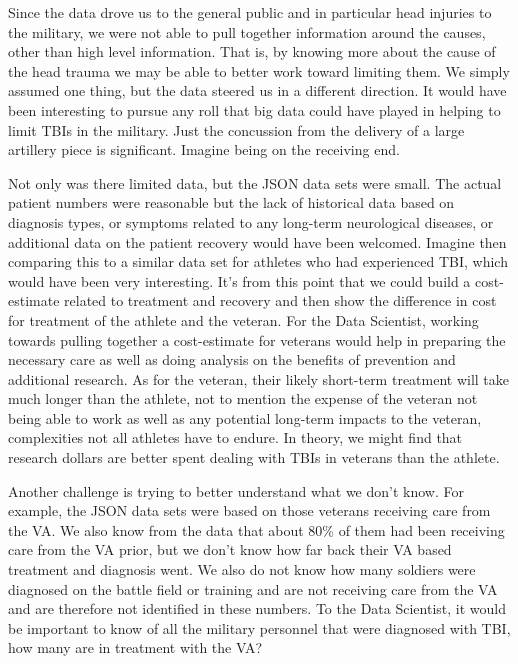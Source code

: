 \documentclass[sigconf]{acmart}
\begin{document}
Since the data drove us to the general public and in particular head injuries to the military, we were not able to pull together information around the causes, other than high level information.  That is, by knowing more about the cause of the head trauma we may be able to better work toward limiting them.  We simply assumed one thing, but the data steered us in a different direction.  It would have been interesting to pursue any roll that big data could have played in helping to limit TBIs in the military.  Just the concussion from the delivery of a large artillery piece is significant.  Imagine being on the receiving end.

Not only was there limited data, but the JSON data sets were small.  The actual patient numbers were reasonable but the lack of historical data based on diagnosis types, or symptoms related to any long-term neurological diseases, or additional data on the patient recovery would have been welcomed.  Imagine then comparing this to a similar data set for athletes who had experienced TBI, which would have been very interesting.  It's from this point that we could build a cost-estimate related to treatment and recovery and then show the difference in cost for treatment of the athlete and the veteran.  For the Data Scientist, working towards pulling together a cost-estimate for veterans would help in preparing the necessary care as well as doing analysis on the benefits of prevention and additional research.  As for the veteran, their likely short-term treatment will take much longer than the athlete, not to mention the expense of the veteran not being able to work as well as any potential long-term impacts to the veteran, complexities not all athletes have to endure.  In theory, we might find that research dollars are better spent dealing with TBIs in veterans than the athlete.

Another challenge is trying to better understand what we don't know.   For example, the JSON data sets were based on those veterans receiving care from the VA.  We also know from the data that about 80\% of them had been receiving care from the VA prior, but we don't know how far back their VA based treatment and diagnosis went.  We also do not know how many soldiers were diagnosed on the battle field or training and are not receiving care from the VA and are therefore not identified in these numbers.  To the Data Scientist, it would be important to know of all the military personnel that were diagnosed with TBI, how many are in treatment with the VA?  
\end{document}
